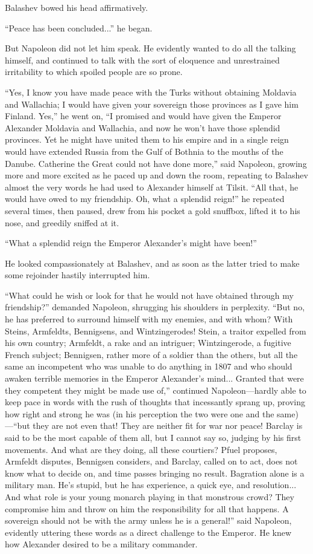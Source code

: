 Balashev bowed his head affirmatively.

``Peace has been concluded...'' he began.

But Napoleon did not let him speak. He evidently wanted to do all
the talking himself, and continued to talk with the sort of
eloquence and unrestrained irritability to which spoiled people
are so prone.

``Yes, I know you have made peace with the Turks without
obtaining Moldavia and Wallachia; I would have given your
sovereign those provinces as I gave him Finland. Yes,'' he went
on, ``I promised and would have given the Emperor Alexander
Moldavia and Wallachia, and now he won't have those splendid
provinces. Yet he might have united them to his empire and in a
single reign would have extended Russia from the Gulf of Bothnia
to the mouths of the Danube. Catherine the Great could not have
done more,'' said Napoleon, growing more and more excited as he
paced up and down the room, repeating to Balashev almost the very
words he had used to Alexander himself at Tilsit. ``All that, he
would have owed to my friendship. Oh, what a splendid reign!'' he
repeated several times, then paused, drew from his pocket a gold
snuffbox, lifted it to his nose, and greedily sniffed at it.

``What a splendid reign the Emperor Alexander's might have
been!''

He looked compassionately at Balashev, and as soon as the latter
tried to make some rejoinder hastily interrupted him.

``What could he wish or look for that he would not have obtained
through my friendship?'' demanded Napoleon, shrugging his
shoulders in perplexity. ``But no, he has preferred to surround
himself with my enemies, and with whom? With Steins, Armfeldts,
Bennigsens, and Wintzingerodes! Stein, a traitor expelled from
his own country; Armfeldt, a rake and an intriguer;
Wintzingerode, a fugitive French subject; Bennigsen, rather more
of a soldier than the others, but all the same an incompetent who
was unable to do anything in 1807 and who should awaken terrible
memories in the Emperor Alexander's mind...  Granted that were
they competent they might be made use of,'' continued
Napoleon---hardly able to keep pace in words with the rush of
thoughts that incessantly sprang up, proving how right and strong
he was (in his perception the two were one and the same)---``but
they are not even that!  They are neither fit for war nor peace!
Barclay is said to be the most capable of them all, but I cannot
say so, judging by his first movements. And what are they doing,
all these courtiers? Pfuel proposes, Armfeldt disputes, Bennigsen
considers, and Barclay, called on to act, does not know what to
decide on, and time passes bringing no result.  Bagration alone
is a military man. He's stupid, but he has experience, a quick
eye, and resolution... And what role is your young monarch
playing in that monstrous crowd? They compromise him and throw on
him the responsibility for all that happens. A sovereign should
not be with the army unless he is a general!'' said Napoleon,
evidently uttering these words as a direct challenge to the
Emperor. He knew how Alexander desired to be a military
commander.

